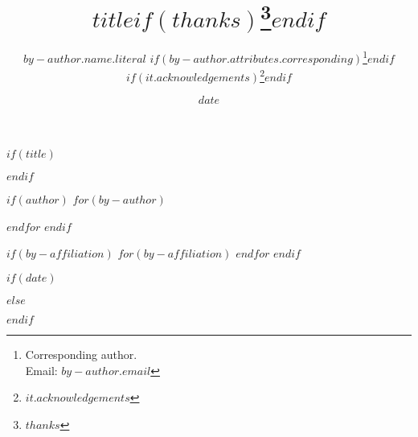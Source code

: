 $if(title)$
\title{$title$$if(thanks)$\thanks{$thanks$}$endif$}
$endif$

$if(author)$
$for(by-author)$
\author[$for(by-author.affiliations)$$it.number$$sep$, $endfor$]{$by-author.name.literal$%
$if(by-author.attributes.corresponding)$\thanks{Corresponding author.\\ Email: \texttt{$by-author.email$}}$endif$%
  $if(it.acknowledgements)$\thanks{$it.acknowledgements$}$endif$ }
$endfor$
$endif$

$if(by-affiliation)$
$for(by-affiliation)$
$endfor$
$endif$

$if(date)$
\date{$date$}
$else$
\date{} %
$endif$